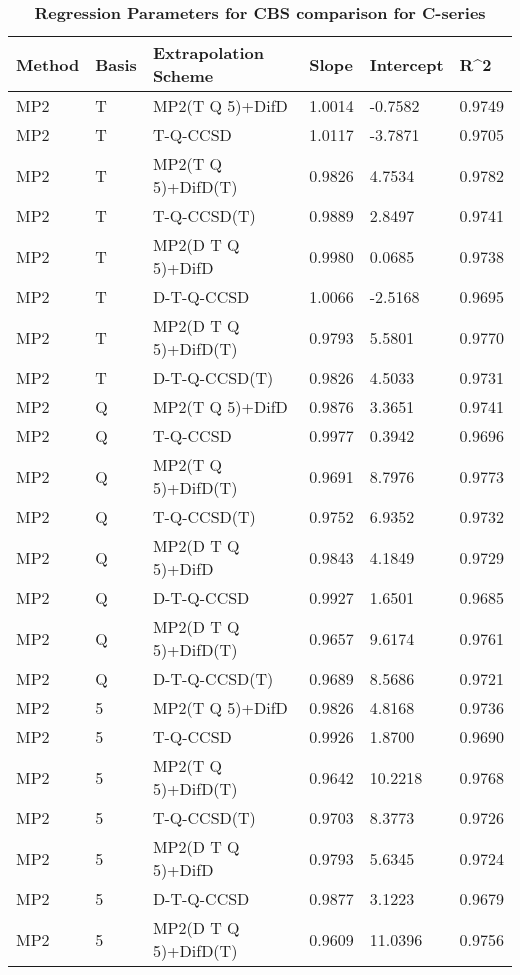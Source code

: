 \begin{table}
  \caption{\textbf{Regression Parameters for CBS comparison for C-series}}
  \label{tbl:regression-two-c}
  \begin{tabular}{l l l l l l }
    \hline
    Method & Basis & Extrapolation Scheme & Slope & Intercept & R^2 \\ 
    \hline
    MP2 & T & MP2(T Q 5)+DifD & 1.0014 & -0.7582 & 0.9749 \\ 
    MP2 & T & T-Q-CCSD & 1.0117 & -3.7871 & 0.9705 \\ 
    MP2 & T & MP2(T Q 5)+DifD(T) & 0.9826 & 4.7534 & 0.9782 \\ 
    MP2 & T & T-Q-CCSD(T) & 0.9889 & 2.8497 & 0.9741 \\ 
    MP2 & T & MP2(D T Q 5)+DifD & 0.9980 & 0.0685 & 0.9738 \\ 
    MP2 & T & D-T-Q-CCSD & 1.0066 & -2.5168 & 0.9695 \\ 
    MP2 & T & MP2(D T Q 5)+DifD(T) & 0.9793 & 5.5801 & 0.9770 \\ 
    MP2 & T & D-T-Q-CCSD(T) & 0.9826 & 4.5033 & 0.9731 \\ 
    MP2 & Q & MP2(T Q 5)+DifD & 0.9876 & 3.3651 & 0.9741 \\ 
    MP2 & Q & T-Q-CCSD & 0.9977 & 0.3942 & 0.9696 \\ 
    MP2 & Q & MP2(T Q 5)+DifD(T) & 0.9691 & 8.7976 & 0.9773 \\ 
    MP2 & Q & T-Q-CCSD(T) & 0.9752 & 6.9352 & 0.9732 \\ 
    MP2 & Q & MP2(D T Q 5)+DifD & 0.9843 & 4.1849 & 0.9729 \\ 
    MP2 & Q & D-T-Q-CCSD & 0.9927 & 1.6501 & 0.9685 \\ 
    MP2 & Q & MP2(D T Q 5)+DifD(T) & 0.9657 & 9.6174 & 0.9761 \\ 
    MP2 & Q & D-T-Q-CCSD(T) & 0.9689 & 8.5686 & 0.9721 \\ 
    MP2 & 5 & MP2(T Q 5)+DifD & 0.9826 & 4.8168 & 0.9736 \\ 
    MP2 & 5 & T-Q-CCSD & 0.9926 & 1.8700 & 0.9690 \\ 
    MP2 & 5 & MP2(T Q 5)+DifD(T) & 0.9642 & 10.2218 & 0.9768 \\ 
    MP2 & 5 & T-Q-CCSD(T) & 0.9703 & 8.3773 & 0.9726 \\ 
    MP2 & 5 & MP2(D T Q 5)+DifD & 0.9793 & 5.6345 & 0.9724 \\ 
    MP2 & 5 & D-T-Q-CCSD & 0.9877 & 3.1223 & 0.9679 \\ 
    MP2 & 5 & MP2(D T Q 5)+DifD(T) & 0.9609 & 11.0396 & 0.9756 \\ 

\end{tabular}
\end{table}
